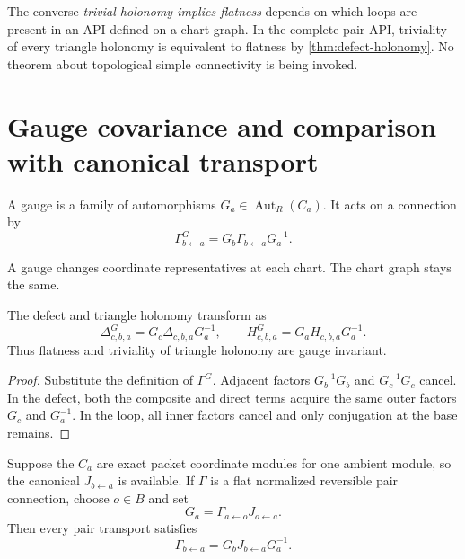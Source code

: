 \begin{remark}
The converse \emph{trivial holonomy implies flatness} depends on which loops
are present in an API defined on a chart graph.  In the complete pair API,
triviality of every triangle holonomy is equivalent to flatness by
\cref{thm:defect-holonomy}.  No theorem about topological simple connectivity is
being invoked.
\end{remark}

\section{Gauge covariance and comparison with canonical transport}
\label{sec:gauge}

\begin{definition}
\label{def:gauge-change}
A gauge is a family of automorphisms $G_a\in\operatorname{Aut}_R(C_a)$.
It acts on a connection by
\[
\Gamma^G_{b\leftarrow a}
=
G_b\Gamma_{b\leftarrow a}G_a^{-1}.
\]
\end{definition}

A gauge changes coordinate representatives at each chart.  The chart graph
stays the same.

\begin{theorem}
\label{thm:gauge-covariance}
The defect and triangle holonomy transform as
\[
\Delta^G_{c,b,a}
=G_c\Delta_{c,b,a}G_a^{-1},
\qquad
H^G_{c,b,a}
=G_aH_{c,b,a}G_a^{-1}.
\]
Thus flatness and triviality of triangle holonomy are gauge invariant.
\end{theorem}

\begin{proof}
Substitute the definition of $\Gamma^G$.  Adjacent factors
$G_b^{-1}G_b$ and $G_c^{-1}G_c$ cancel.  In the defect, both the composite
and direct terms acquire the same outer factors $G_c$ and $G_a^{-1}$.  In
the loop, all inner factors cancel and only conjugation at the base remains.
\end{proof}

\begin{theorem}
\label{thm:flat-gauge-canonical}
Suppose the $C_a$ are exact packet coordinate modules for one ambient module,
so the canonical $J_{b\leftarrow a}$ is available.  If $\Gamma$ is a flat
normalized reversible pair connection, choose $o\in B$ and set
\[
G_a=\Gamma_{a\leftarrow o}J_{o\leftarrow a}.
\]
Then every pair transport satisfies
\[
\boxed{
\Gamma_{b\leftarrow a}
=G_bJ_{b\leftarrow a}G_a^{-1}.
}
\]
\end{theorem}

